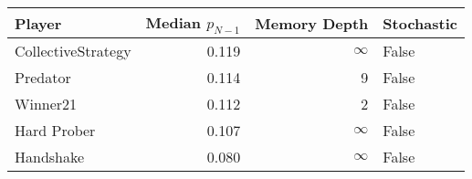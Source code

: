 \begin{tabular}{lrrl}
\toprule
             Player &  Median $p_{N-1}$ &  Memory Depth & Stochastic \\
\midrule
 CollectiveStrategy &             0.119 &            \(\infty\) &      False \\
           Predator &             0.114 &             9 &      False \\
           Winner21 &             0.112 &             2 &      False \\
        Hard Prober &             0.107 &            \(\infty\) &      False \\
          Handshake &             0.080 &            \(\infty\) &      False \\
\bottomrule
\end{tabular}
